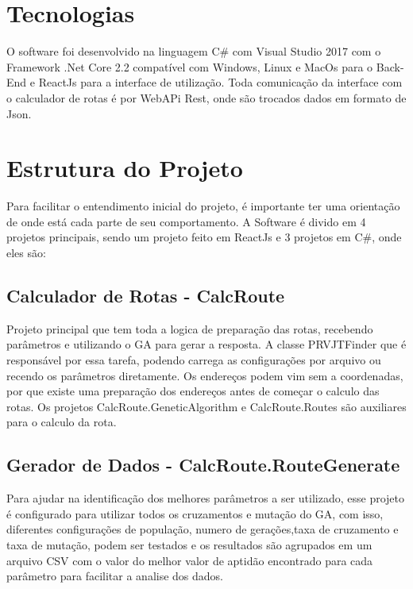 \section{Tecnologias}

O software foi desenvolvido na linguagem C\# com Visual Studio 2017 com o Framework  .Net Core 2.2 compatível com Windows, Linux e MacOs para o Back-End e ReactJs para a interface de utilização.
Toda comunicação da interface com o calculador de rotas é por WebAPi Rest, onde são trocados dados em formato de Json.

\section{Estrutura do Projeto}

Para facilitar o entendimento inicial do projeto, é importante ter uma orientação de onde está cada parte de seu comportamento. A Software é divido em 4 projetos principais, sendo um projeto feito em ReactJs e 3  projetos em C\#, onde eles são:

\subsection{Calculador de Rotas - CalcRoute}

Projeto principal que tem toda a logica de preparação das rotas, recebendo parâmetros e utilizando o GA para gerar a resposta.
A classe PRVJTFinder que é responsável por essa tarefa, podendo carrega as configurações por arquivo ou recendo os parâmetros diretamente. Os endereços podem vim sem a coordenadas, por que existe uma preparação dos endereços antes de começar o calculo das rotas. Os projetos CalcRoute.GeneticAlgorithm e CalcRoute.Routes são auxiliares para o calculo da rota.

\subsection{Gerador de Dados - CalcRoute.RouteGenerate}

Para ajudar na identificação dos melhores parâmetros a ser utilizado, esse projeto é configurado para utilizar todos os cruzamentos e mutação do GA, com isso, diferentes configurações de população, numero de gerações,taxa de cruzamento e taxa de mutação, podem ser testados e os resultados são agrupados em um arquivo CSV com o valor do melhor valor de aptidão encontrado para cada parâmetro para facilitar a analise dos dados.

